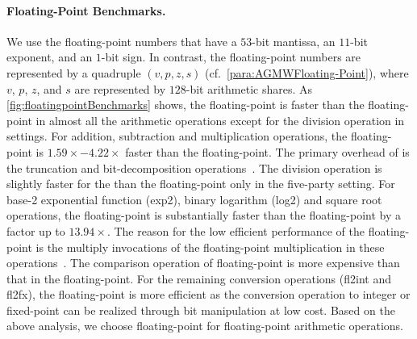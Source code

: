 \paragraph{Floating-Point Benchmarks.}
\label{para:Floating-PointBenchmarking}
We use the \booleanGMW floating-point numbers that have a $53$-bit mantissa, an $11$-bit exponent, and an $1$-bit sign. In contrast, the \arithmeticGMW floating-point numbers are represented by a quadruple $\left(v, p, z, s\right) $ (cf.~\autoref{para:AGMWFloating-Point}), where $v$, $p$, $z$, and $s$ are represented by $128$-bit arithmetic shares. As \autoref{fig:floatingpointBenchmarks} shows, the \booleanGMW floating-point is faster than the \arithmeticGMW floating-point in almost all the arithmetic operations except for the division operation in \twopc settings. For addition, subtraction and multiplication operations, the \booleanGMW floating-point is $1.59\times-4.22\times$ faster than the \arithmeticGMW floating-point. The primary overhead of \arithmeticGMW is the truncation and bit-decomposition operations~\cite{aliasgari2012secure}. The division operation is slightly faster for the \arithmeticGMW than the \booleanGMW floating-point only in the five-party setting. For base-2 exponential function (exp2), binary logarithm (log2) and square root operations, the \booleanGMW floating-point is substantially faster than the \arithmeticGMW floating-point by a factor up to $13.94\times$. The reason for the low efficient performance of the \arithmeticGMW floating-point is the multiply invocations of the floating-point multiplication in these operations~\cite{aliasgari2012secure}. The comparison operation of \arithmeticGMW floating-point is more expensive than that in the \booleanGMW floating-point. For the remaining conversion operations (fl2int and fl2fx), the \booleanGMW floating-point is more efficient as the conversion operation to integer or fixed-point can be realized through bit manipulation at low cost. Based on the above analysis, we choose \booleanGMW floating-point for floating-point arithmetic operations.



